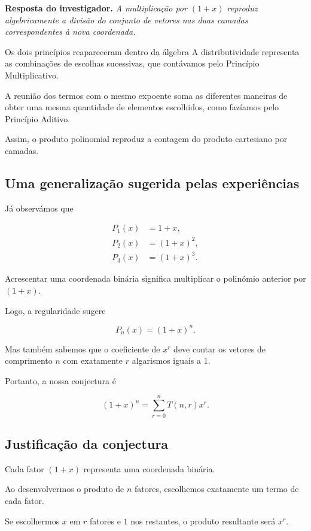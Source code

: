 \documentclass[11pt,a4paper,oneside]{book}
\newcommand{\Resposta}[1]{\textcolor{verdeescuro}{\textbf{Resposta do investigador.}} \emph{#1}\par}
\begin{document}
\Resposta{A multiplicação por $(1+x)$
reproduz algebricamente a divisão do
conjunto de vetores nas duas camadas
correspondentes à nova coordenada.}

\begin{descobertabox}{Os dois princípios reapareceram dentro da álgebra}
A distributividade representa as combinações
de escolhas sucessivas, que contávamos
pelo Princípio Multiplicativo.

A reunião dos termos com o mesmo expoente
soma as diferentes maneiras de obter
uma mesma quantidade de elementos escolhidos,
como fazíamos pelo Princípio Aditivo.

Assim, o produto polinomial reproduz
a contagem do produto cartesiano por camadas.
\end{descobertabox}

\subsection*{Uma generalização sugerida pelas experiências}

Já observámos que

\[
\begin{aligned}
P_1(x)&=1+x,\\
P_2(x)&=(1+x)^2,\\
P_3(x)&=(1+x)^3.
\end{aligned}
\]

Acrescentar uma coordenada binária significa
multiplicar o polinómio anterior por $(1+x)$.

Logo, a regularidade sugere

\[
P_n(x)=(1+x)^n.
\]

Mas também sabemos que o coeficiente de
$x^r$ deve contar os vetores de comprimento
$n$ com exatamente $r$ algarismos iguais a $1$.

Portanto, a nossa conjectura é

\[
\boxed{
(1+x)^n=\sum_{r=0}^{n}T(n,r)x^r
}.
\]

\subsection*{Justificação da conjectura}

Cada fator $(1+x)$ representa uma
coordenada binária.

Ao desenvolvermos o produto de $n$ fatores,
escolhemos exatamente um termo de cada fator.

Se escolhermos $x$ em $r$ fatores e $1$
nos restantes, o produto resultante será $x^r$.
\end{document}
